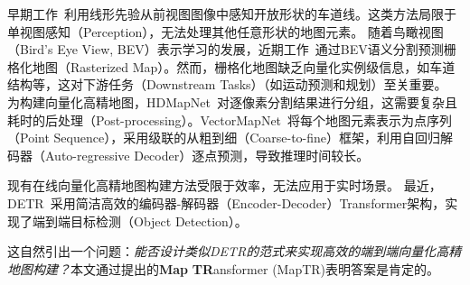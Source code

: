 \documentclass{article} %
\def\eg{\emph{e.g.}} \def\Eg{\emph{E.g.}}
\begin{document}
早期工作~\citep{chen2022persformer,lstr,can2021structured}利用线形先验从前视图图像中感知开放形状的车道线。这类方法局限于单视图感知（Perception），无法处理其他任意形状的地图元素。
随着鸟瞰视图（Bird's Eye View, BEV）表示学习的发展，近期工作~\citep{gkt,cvt,fiery,bevformer}通过BEV语义分割预测栅格化地图（Rasterized Map）。然而，栅格化地图缺乏向量化实例级信息，如车道结构等，这对下游任务（Downstream Tasks）（如运动预测和规划）至关重要。
为构建向量化高精地图，HDMapNet~\citep{hdmapnet}对逐像素分割结果进行分组，这需要复杂且耗时的后处理（Post-processing）。VectorMapNet~\citep{vectormapnet}将每个地图元素表示为点序列（Point Sequence），采用级联的从粗到细（Coarse-to-fine）框架，利用自回归解码器（Auto-regressive Decoder）逐点预测，导致推理时间较长。

现有在线向量化高精地图构建方法受限于效率，无法应用于实时场景。
最近，DETR~\citep{detr}采用简洁高效的编码器-解码器（Encoder-Decoder）Transformer架构，实现了端到端目标检测（Object Detection）。

这自然引出一个问题：\textit{能否设计类似DETR的范式来实现高效的端到端向量化高精地图构建？}本文通过提出的\textbf{Map} \textbf{TR}ansformer (MapTR)表明答案是肯定的。


\end{document}
